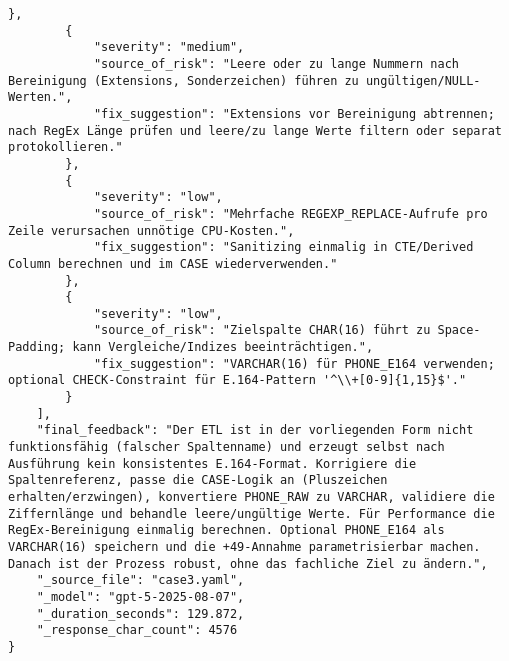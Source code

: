 \begin{lstlisting}[caption={Ausgabe: GPT-5 Anwendungsfall 3 Konsistenzdurchlauf},label={gpt_case3_prompt2}]
        },
        {
            "severity": "medium",
            "source_of_risk": "Leere oder zu lange Nummern nach Bereinigung (Extensions, Sonderzeichen) führen zu ungültigen/NULL-Werten.",
            "fix_suggestion": "Extensions vor Bereinigung abtrennen; nach RegEx Länge prüfen und leere/zu lange Werte filtern oder separat protokollieren."
        },
        {
            "severity": "low",
            "source_of_risk": "Mehrfache REGEXP_REPLACE-Aufrufe pro Zeile verursachen unnötige CPU-Kosten.",
            "fix_suggestion": "Sanitizing einmalig in CTE/Derived Column berechnen und im CASE wiederverwenden."
        },
        {
            "severity": "low",
            "source_of_risk": "Zielspalte CHAR(16) führt zu Space-Padding; kann Vergleiche/Indizes beeinträchtigen.",
            "fix_suggestion": "VARCHAR(16) für PHONE_E164 verwenden; optional CHECK-Constraint für E.164-Pattern '^\\+[0-9]{1,15}$'."
        }
    ],
    "final_feedback": "Der ETL ist in der vorliegenden Form nicht funktionsfähig (falscher Spaltenname) und erzeugt selbst nach Ausführung kein konsistentes E.164-Format. Korrigiere die Spaltenreferenz, passe die CASE-Logik an (Pluszeichen erhalten/erzwingen), konvertiere PHONE_RAW zu VARCHAR, validiere die Ziffernlänge und behandle leere/ungültige Werte. Für Performance die RegEx-Bereinigung einmalig berechnen. Optional PHONE_E164 als VARCHAR(16) speichern und die +49-Annahme parametrisierbar machen. Danach ist der Prozess robust, ohne das fachliche Ziel zu ändern.",
    "_source_file": "case3.yaml",
    "_model": "gpt-5-2025-08-07",
    "_duration_seconds": 129.872,
    "_response_char_count": 4576
}
\end{lstlisting}

